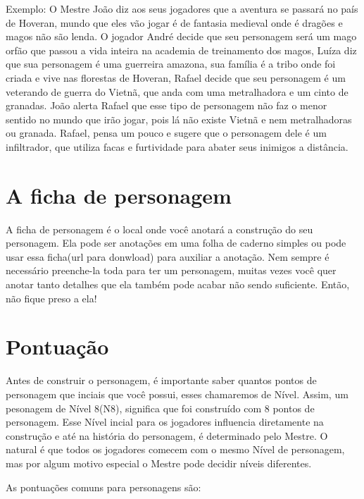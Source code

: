 Exemplo: O Mestre João diz aos seus jogadores que a aventura se passará no país de Hoveran, mundo que eles vão jogar é de fantasia medieval onde é dragões e magos não são lenda. O jogador André decide que seu personagem será um mago orfão que passou a vida inteira na academia de treinamento dos magos, Luíza diz que sua personagem é uma guerreira amazona, sua família é a tribo onde foi criada e vive nas florestas de Hoveran, Rafael decide que seu personagem é um veterando de guerra do Vietnã, que anda com uma metralhadora e um cinto de granadas. João alerta Rafael que esse tipo de personagem não faz o menor sentido no mundo que irão jogar, pois lá não existe Vietnã e nem metralhadoras ou granada. Rafael, pensa um pouco e sugere que o personagem dele é um infiltrador, que utiliza facas e furtividade para abater seus inimigos a distância.

\section{A ficha de personagem}

A ficha de personagem é o local onde você anotará a construção do seu personagem. Ela pode ser anotações em uma folha de caderno simples ou pode usar essa ficha(url para donwload) para auxiliar a anotação. Nem sempre é necessário preenche-la toda para ter um personagem, muitas vezes você quer anotar tanto detalhes que ela também pode acabar não sendo suficiente. Então, não fique preso a ela!

\section{Pontuação}
Antes de construir o personagem, é importante saber quantos pontos de personagem que inciais que você possui, esses chamaremos de Nível. Assim, um pesonagem de Nível 8(N8), significa que foi construído com 8 pontos de personagem. Esse Nível incial para os jogadores influencia diretamente na construção e até na história do personagem, é determinado pelo Mestre. O natural é que todos os jogadores comecem com o mesmo Nível de personagem, mas por algum motivo especial o Mestre pode decidir níveis diferentes.

As pontuações comuns para personagens são:


